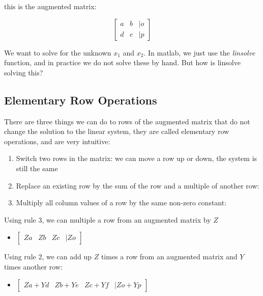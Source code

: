 \documentclass[
]{book}
\providecommand{\tightlist}{%
  \setlength{\itemsep}{0pt}\setlength{\parskip}{0pt}}
\begin{document}
this is the augmented matrix:

\[\left\lbrack \begin{array}{ccl}
a & b & |o\\
d & e & |p
\end{array}\right\rbrack\]

We want to solve for the unknown \(x_1\) and \(x_2\). In matlab, we just use
the \emph{linsolve} function, and in practice we do not solve these by hand.
But how is linsolve solving this?

\hypertarget{elementary-row-operations}{%
\subsection{Elementary Row Operations}\label{elementary-row-operations}}

There are three things we can do to rows of the augmented matrix that do
not change the solution to the linear system, they are called elementary
row operations, and are very intuitive:

\begin{enumerate}
\def\labelenumi{\arabic{enumi}.}
\item
  Switch two rows in the matrix: we can move a row up or down, the
  system is still the same
\item
  Replace an existing row by the sum of the row and a multiple of
  another row:
\item
  Multiply all column values of a row by the same non-zero constant:
\end{enumerate}

Using rule 3, we can multiple a row from an augmented matrix by \(Z\)

\begin{itemize}
\tightlist
\item
  \(\displaystyle \left\lbrack \begin{array}{cccc} Za & Zb & Zc & |Zo \end{array}\right\rbrack\)
\end{itemize}

Using rule 2, we can add up \(Z\) times a row from an augmented matrix and
\(Y\) times another row:

\begin{itemize}
\tightlist
\item
  \(\displaystyle \left\lbrack \begin{array}{cccc} Za+Yd & Zb+Ye & Zc+Yf & |Zo+Yp \end{array}\right\rbrack\)
\end{itemize}
\end{document}
